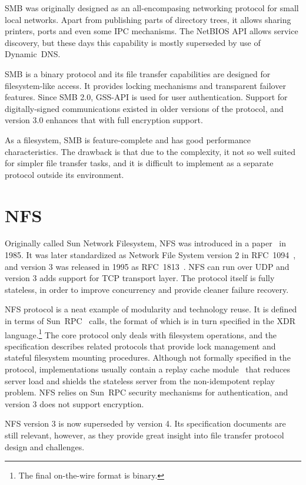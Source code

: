 SMB was originally designed as an all-encompasing networking protocol for small local networks. Apart from
publishing parts of directory trees, it allows sharing printers, ports and even some IPC mechanisms. The
NetBIOS API allows service discovery, but these days this capability is mostly superseded by use of
Dynamic~DNS.

SMB is a binary protocol and its file transfer capabilities are designed for filesystem-like access. It
provides locking mechanisms and transparent failover features. Since SMB 2.0, GSS-API is used for user
authentication.  Support for digitally-signed communications existed in older versions of the protocol, and
version 3.0 enhances that with full encryption support.

As a filesystem, SMB is feature-complete and has good performance characteristics. The drawback is that due to
the complexity, it not so well suited for simpler file transfer tasks, and it is difficult to implement as
a separate protocol outside its environment.

\section{NFS}

Originally called Sun Network Filesystem, NFS was introduced in a paper~\cite{nfs85} in 1985. It was later
standardized as Network File System version 2 in RFC~1094~\cite{rfc1094}, and version 3 was released in 1995
as RFC~1813~\cite{rfc1813}. NFS can run over UDP and version 3 adds support for TCP transport layer. The
protocol itself is fully stateless, in order to improve concurrency and provide cleaner failure recovery.

NFS protocol is a neat example of modularity and technology reuse. It is defined in terms of
Sun~RPC~\cite{rfc1057} calls, the format of which is in turn specified in the XDR~\cite{rfc1832}
language.\footnote{The final on-the-wire format is binary.} The core protocol only deals with filesystem
operations, and the specification describes related protocols that provide lock management and stateful
filesystem mounting procedures. Although not formally specified in the protocol, implementations usually
contain a replay cache module~\cite{juszczak89} that reduces server load and shields the stateless server from
the non-idempotent replay problem. NFS relies on Sun~RPC security mechanisms for authentication, and version
3 does not support encryption.

NFS version 3 is now superseded by version 4. Its specification documents are still relevant, however, as they
provide great insight into file transfer protocol design and challenges.

